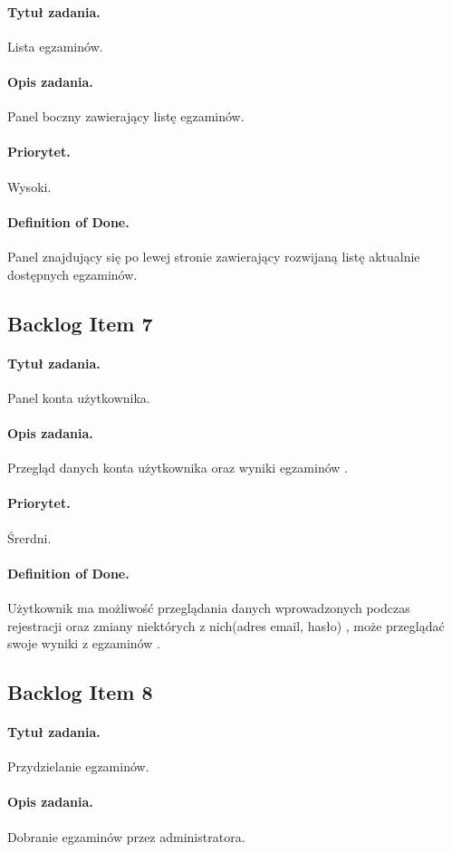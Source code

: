 \documentclass[a4paper]{article}
\begin{document}
\paragraph{Tytuł zadania.} Lista egzaminów.
\paragraph{Opis zadania.} Panel boczny zawierający listę egzaminów.
\paragraph{Priorytet.} Wysoki.
\paragraph{Definition of Done.} Panel znajdujący się po lewej stronie zawierający rozwijaną listę aktualnie dostępnych egzaminów.

\subsection{Backlog Item 7}
\paragraph{Tytuł zadania.} Panel konta użytkownika.
\paragraph{Opis zadania.} Przegląd danych konta użytkownika oraz wyniki egzaminów .
\paragraph{Priorytet.} Śrerdni.
\paragraph{Definition of Done.} Użytkownik ma możliwość przeglądania danych wprowadzonych podczas rejestracji oraz zmiany niektórych z nich(adres email, hasło) , może przeglądać swoje wyniki z egzaminów .

\subsection{Backlog Item 8}
\paragraph{Tytuł zadania.} Przydzielanie egzaminów.
\paragraph{Opis zadania.} Dobranie egzaminów przez administratora.
\end{document}
